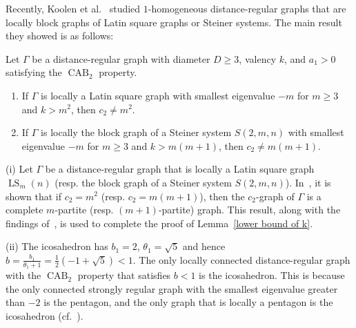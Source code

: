 Recently, Koolen et al.~\cite{KLLLLT2023+} studied $1$-homogeneous distance-regular graphs that are locally block graphs of Latin square graphs or Steiner systems. 
The main result they showed is as follows:
\begin{lemma}\label{lower bound of k}
Let $\Gamma$ be a distance-regular graph with diameter $D \geqslant 3$, valency $k$, and $a_1>0$ satisfying the $\operatorname{CAB}_2$ property.
\begin{enumerate}[\normalfont(i)]
  \item If $\Gamma$ is locally a Latin square graph with smallest eigenvalue $-m$ for $m \geqslant 3$ and $k > m^2$, then $c_2 \neq m^2$.
  \item If $\Gamma$ is locally the block graph of a Steiner system $S(2,m,n)$ with smallest eigenvalue $-m$ for $m \geqslant 3$ and $k >m(m+1)$, then $c_2 \neq m(m+1)$.
\end{enumerate}
\end{lemma} 

\begin{rema}
(i) Let $\Gamma$ be a distance-regular graph that is locally a Latin square graph $\operatorname{LS}_m(n)$ (resp. the block graph of a Steiner system $S(2,m,n)$). 
In~\cite{KLLLLT2023+}, it is shown that if $c_2=m^2$ (resp. $c_2=m(m+1)$), then the $c_2$-graph of $\Gamma$ is a complete $m$-partite (resp. $(m+1)$-partite) graph. 
This result, along with the findings of~\cite{JMT2010}, is used to complete the proof of Lemma~\ref{lower bound of k}.

(ii) The icosahedron has $b_1=2$, $\theta_1=\sqrt{5}$ and hence \mbox{$b = \frac{b_1}{\theta_1 +1} =\frac{1}{2}(-1+\sqrt{5})< 1$}.
The only locally connected distance-regular graph with the $\operatorname{CAB}_2$ property that satisfies $b  < 1$ is the icosahedron.
This is because the only connected strongly regular graph with the smallest eigenvalue greater than $-2$ is the pentagon, and the only graph that is locally a pentagon is the icosahedron (cf.~\cite[p.~35]{BCN}).
\end{rema}

